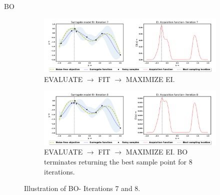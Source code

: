 \documentclass[10pt]{beamer}
\begin{document}
\begin{frame}{BO}

    \begin{figure}[!ht]
		\centering
		\begin{subfigure}{1\textwidth}
  			\centering
  			\includegraphics[scale=0.238]{images/BO7.png}
  			\caption{EVALUATE $\rightarrow$ FIT $\rightarrow$ MAXIMIZE EI.}
  			\label{fig:BO7}
		\end{subfigure}
		
	\begin{subfigure}{1\textwidth}
  			\centering
  			\includegraphics[scale=0.238]{images/BO8.png}
  			\caption{EVALUATE $\rightarrow$ FIT $\rightarrow$ MAXIMIZE EI. BO terminates returning the best sample point for 8 iterations.}
  			\label{fig:BO8}
		\end{subfigure}
	
\captionsetup{justification=justified}
\caption[Illustration of BO- Iterations 1 to 4.]{Illustration of BO- Iterations 7 and 8.}
\label{fig:BO_steps4}
\end{figure}
    
\end{frame}
\end{document}

